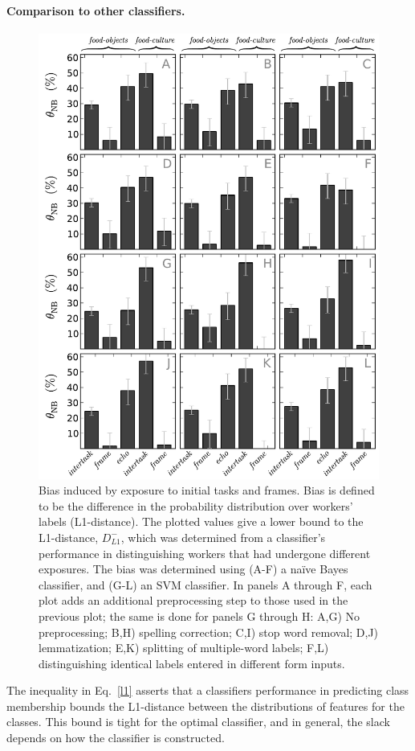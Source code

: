 \documentclass[12pt]{article}
\begin{document}
\paragraph{Comparison to other classifiers.} 

\begin{figure}
	\centering
	\includegraphics[scale=0.75]{figs/theta_sup.pdf}
	\caption{
		Bias induced by exposure to initial tasks and frames.
		Bias is defined to be the difference in the probability 
		distribution over workers' labels (L1-distance).  The plotted values
		give a lower bound to the L1-distance, $D_{L1}^-$, which was 
		determined from a classifier's performance in 
		distinguishing workers that had undergone different exposures.
		The bias was determined using (A-F) a na\"ive Bayes classifier, and 
		(G-L) an SVM classifier.
		In panels A through F, each plot adds an additional
		preprocessing step to those used in the previous plot; the same is 
		done for panels G through H: A,G) No 
		preprocessing; B,H) spelling correction; C,I) stop word removal; 
		D,J) lemmatization; E,K) splitting of multiple-word labels; 
		F,L) distinguishing identical labels entered in different form inputs.
	}
	\label{fig:theta_sup}
\end{figure}
The inequality in Eq.~\ref{l1}
asserts that a classifiers performance in predicting class membership
bounds the L1-distance between the distributions of features for the classes.
This bound is tight for the optimal classifier, and in general, the slack
depends on how the classifier is constructed.
\end{document}
